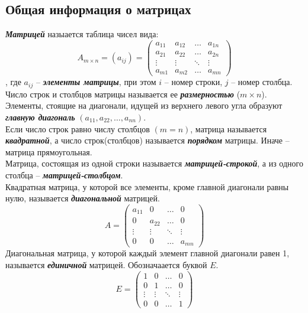 \documentclass[12pt, fleqn]{article}
\begin{document}
\subsection*{Общая информация о матрицах}
\textbf{\textit{Матрицей}} назыается таблица чисел вида:
\begin{equation*}
	A_{m\times n} = \left(a_{ij}\right) = \left(
	\begin{array}{cccc}
		a_{11} & a_{12} & \ldots & a_{1n}\\
		a_{21} & a_{22} & \ldots & a_{2n}\\
		\vdots & \vdots & \ddots & \vdots\\
		a_{m1} & a_{m2} & \ldots & a_{mn}
	\end{array}
	\right)
\end{equation*}, 
где $a_{ij}$ -- \textbf{\textit{элементы матрицы}}, при этом $i$ -- номер строки, $j$ -- номер столбца.\\
Число строк и столбцов матрицы называется ее \textbf{\textit{размерностью}} ($m\times n$).\\
Элементы, стоящие на диагонали, идущей из верхнего левого угла образуют \textbf{\textit{главную диагональ}} $\left(a_{11}, a_{22}, \dots , a_{nn}\right)$.\\
Если число строк равно числу столбцов $(m=n)$, матрица называется \textbf{\textit{квадратной}}, а число строк(столбцов) называется \textbf{\textit{порядком}} матрицы. Иначе -- матрица прямоугольная.\\
Матрица, состоящая из одной строки называется \textbf{\textit{матрицей-строкой}}, а из одного столбца -- \textbf{\textit{матрицей-столбцом}}.\\
Квадратная матрица, у которой все элементы, кроме главной диагонали равны нулю, называется \textbf{\textit{диагональной}} матрицей.
\begin{equation*}
	A= \left(
	\begin{array}{cccc}
		a_{11} & 0 & \ldots & 0\\
		0 & a_{22} & \ldots & 0\\
		\vdots & \vdots & \ddots & \vdots\\
		0 & 0 & \ldots & a_{mn}
	\end{array}
	\right)
\end{equation*}
Диагональная матрица, у которой каждый элемент главной диагонали равен 1, называется \textbf{\textit{единичной}} матрицей. Обозначаается буквой $E$.
\begin{equation*}
	E = \left(
	\begin{array}{cccc}
		1 & 0 & \ldots & 0\\
		0 & 1 & \ldots & 0\\
		\vdots & \vdots & \ddots & \vdots\\
		0 & 0 & \ldots & 1
	\end{array}
	\right)
\end{equation*}
\end{document}

